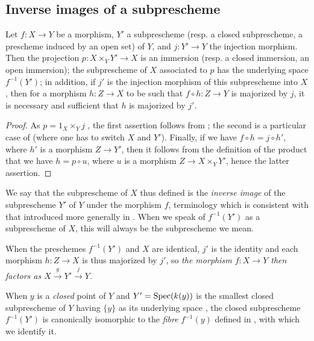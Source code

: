 \subsection{Inverse images of a subprescheme}
\label{subsection-inverse-image-of-subprescheme}

\begin{prop}[4.4.1]
\label{1.4.4.1}
Let $f:X\to Y$ be a morphism, $Y'$ a subprescheme (resp. a closed subprescheme, a prescheme induced by an open set) of $Y$, and $j:Y'\to Y$ the injection morphism.
Then the projection $p:X\times_Y Y'\to X$ is an immersion (resp. a closed immersion, an open immersion); the subprescheme of $X$ associated to $p$ has the underlying space $f^{-1}(Y')$; in addition, if $j'$ is the injection morphism of this subprescheme into $X$, then for a morphism $h:Z\to X$ to be such that $f\circ h:Z\to Y$ is majorized by $j$, it is necessary and sufficient that $h$ is majorized by $j'$.
\end{prop}

\begin{proof}
\label{proof-1.4.4.1}
As $p=1_X\times_Y j$ , the first assertion follows from ; the second is a particular case of  (where one has to switch $X$ and $Y'$).
Finally, if we have $f\circ h=j\circ h'$, where $h'$ is a morphism $Z\to Y'$, then it follows from the definition of the product that we have $h=p\circ u$, where $u$ is a morphism $Z\to X\times_Y Y'$, hence the latter assertion.
\end{proof}

We say that the subprescheme of $X$ thus defined is the \emph{inverse image} of the subprescheme $Y'$ of $Y$ under the morphism $f$, terminology which is consistent with that introduced
more generally in .
When we speak of $f^{-1}(Y')$ as a subprescheme of $X$, this will always be the subprescheme we mean.

When the preschemes $f^{-1}(Y')$ and $X$ are identical, $j'$ is the identity and each morphism $h:Z\to X$ is thus majorized by $j'$, so \emph{the morphism $f:X\to Y$ then factors as $X\xrightarrow{g}Y'\xrightarrow{j}Y$}.

When $y$ is a \emph{closed} point of $Y$ and $Y'={\mathop{\mathrm{Spec}}\nolimits}(k(y))$ is the smallest closed subprescheme of $Y$ having $\{y\}$ as its underlying space , the closed subprescheme $f^{-1}(Y')$ is canonically isomorphic to the \emph{fibre} $f^{-1}(y)$ defined in , with which we identify it.

